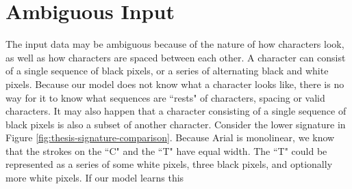 \section{Ambiguous Input}
The input data may be ambiguous because of the nature of how characters look, as well as how characters are spaced between each other. A character can consist of a single sequence of black pixels, or a series of alternating black and white pixels. Because our model does not know what a character looks like, there is no way for it to know what sequences are ``rests" of characters, spacing or valid characters. It may also happen that a character consisting of a single sequence of black pixels is also a subset of another character. Consider the lower signature in Figure \ref{fig:thesis-signature-comparison}. Because Arial is monolinear, we know that the strokes on the ``C" and the ``T" have equal width. The ``T" could be represented as a series of some white pixels, three black pixels, and optionally more white pixels. If our model learns this 